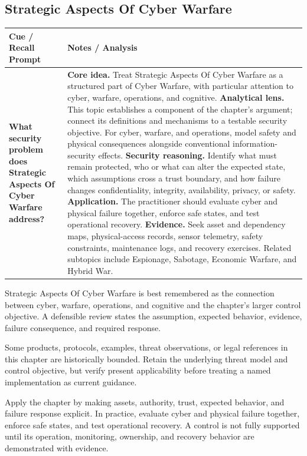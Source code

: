 \documentclass[11pt]{article}
\newcommand{\CornellHeader}{%
\rowcolor{Navy}\color{white}\bfseries Cue / Recall Prompt & \color{white}\bfseries Notes / Analysis\\\hline}
\newcommand{\CornellRow}[2]{%
\cellcolor{CueGray}\RaggedRight\textbf{#1} & \RaggedRight #2\\\hline}
\begin{document}
\subsection*{Strategic Aspects Of Cyber Warfare}
\begin{longtable}{>{\RaggedRight\arraybackslash}p{}|>{\RaggedRight\arraybackslash}p{}}
\CornellHeader
\CornellRow{What security problem does Strategic Aspects Of Cyber Warfare address?}{\textbf{Core idea.} Treat Strategic Aspects Of Cyber Warfare as a structured part of Cyber Warfare, with particular attention to cyber, warfare, operations, and cognitive. \textbf{Analytical lens.} This topic establishes a component of the chapter's argument; connect its definitions and mechanisms to a testable security objective. For cyber, warfare, and operations, model safety and physical consequences alongside conventional information-security effects. \textbf{Security reasoning.} Identify what must remain protected, who or what can alter the expected state, which assumptions cross a trust boundary, and how failure changes confidentiality, integrity, availability, privacy, or safety. \textbf{Application.} The practitioner should evaluate cyber and physical failure together, enforce safe states, and test operational recovery. \textbf{Evidence.} Seek asset and dependency maps, physical-access records, sensor telemetry, safety constraints, maintenance logs, and recovery exercises. Related subtopics include Espionage, Sabotage, Economic Warfare, and Hybrid War.}
\end{longtable}
\begin{topicsummary}
Strategic Aspects Of Cyber Warfare is best remembered as the connection between cyber, warfare, operations, and cognitive and the chapter's larger control objective. A defensible review states the assumption, expected behavior, evidence, failure consequence, and required response.
\end{topicsummary}
\begin{historybox}
Some products, protocols, examples, threat observations, or legal references in this chapter are historically bounded. Retain the underlying threat model and control objective, but verify present applicability before treating a named implementation as current guidance.
\end{historybox}
\begin{defensebox}
Apply the chapter by making assets, authority, trust, expected behavior, and failure response explicit. In practice, evaluate cyber and physical failure together, enforce safe states, and test operational recovery. A control is not fully supported until its operation, monitoring, ownership, and recovery behavior are demonstrated with evidence.
\end{defensebox}
\end{document}
